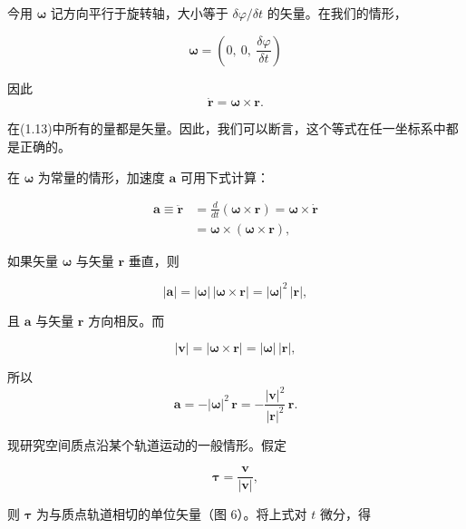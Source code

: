 \documentclass[11pt,a4paper,oneside]{ctexbook}
\newcommand{\ve}[1]{\bm{#1}}
\begin{document}
今用 $\ve{\omega}$ 记方向平行于旋转轴，大小等于 $\delta\varphi / \delta t$ 的矢量。在我们的情形，

\begin{equation*}
\ve{\omega} = \left(0,\ 0,\ \frac{\delta\varphi}{\delta t}\right)
\end{equation*}

因此
\begin{equation}
\dot{\ve{r}} = \ve{\omega} \times \ve{r}.
\tag{1.13}
\end{equation}

在(1.13)中所有的量都是矢量。因此，我们可以断言，这个等式在任一坐标系中都是正确的。

在 $\ve{\omega}$ 为常量的情形，加速度 $\ve{a}$ 可用下式计算：

\begin{equation*}
\begin{aligned}
\ve{a} \equiv \ddot{\ve{r}} &= \frac{d}{dt}(\ve{\omega} \times \ve{r}) = \ve{\omega} \times \dot{\ve{r}}\\
&= \ve{\omega} \times (\ve{\omega} \times \ve{r}),
\end{aligned}
\end{equation*}

如果矢量 $\ve{\omega}$ 与矢量 $\ve{r}$ 垂直，则

\begin{equation*}
|\ve{a}| = |\ve{\omega}|\,|\ve{\omega} \times \ve{r}| = |\ve{\omega}|^{2}\,|\ve{r}|,
\end{equation*}

且 $\ve{a}$ 与矢量 $\ve{r}$ 方向相反。而

\begin{equation*}
|\ve{v}| = |\ve{\omega} \times \ve{r}| = |\ve{\omega}|\,|\ve{r}|,
\end{equation*}

所以
\begin{equation*}
\ve{a} = -|\ve{\omega}|^{2}\,\ve{r} = -\frac{|\ve{v}|^{2}}{|\ve{r}|^{2}}\,\ve{r}.
\end{equation*}

现研究空间质点沿某个轨道运动的一般情形。假定

\begin{equation*}
\ve{\tau} = \frac{\ve{v}}{|\ve{v}|},
\end{equation*}

则 $\ve{\tau}$ 为与质点轨道相切的单位矢量（图 6）。将上式对 $t$ 微分，得
\end{document}
